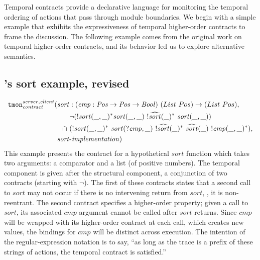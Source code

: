 Temporal contracts provide a declarative language for monitoring the temporal ordering of actions that pass through module boundaries.
%
We begin with a simple example that exhibits the expressiveness of temporal higher-order contracts to frame the discussion.
%
The following example comes from the original work on temporal higher-order contracts, and its behavior led us to explore alternative semantics.
%
\newcommand{\sortid}{\mathit{sort}}
\subsection{\dfm's sort example, revised} \label{sec:sort}
%
\renewcommand*{\arraystretch}{1.2}
\newcommand*{\call}[1]{\scallev{#1}{\_}}
\newcommand*{\ret}[1]{\sretev{#1}{\_}}
\begin{align*}
 {\tt tmon}^{{\mathit{server}},{\mathit{client}}}_{\mathit{contract}}(\sortid &: (\mathit{cmp} : \mathit{Pos} \to \mathit{Pos} \to \mathit{Bool})\ (List\ Pos) \to (List\ Pos), \\
 &\stnot{(\stmany{\snonevent{\sortid(\_,\_)}} \sortid(\_,\_)~ \stmany{\snonevent{\retof{\sortid}(\_)}}~ \sortid(\_,\_))} \\
 \cap\  &(\stmany{\snonevent{\sortid(\_,\_)}}~ \sortid(?\mathit{cmp}, \_)~ \stmany{\snonevent{\retof{\sortid}(\_)}}~ \retof{\sortid}(\_)~ \stmany{\snonevent{\mathit{cmp}(\_,\_)}}), \\
 \mathit{sort}&\text{-}\mathit{implementation})
\end{align*}
%
This example presents the contract for a hypothetical $\sortid$ function which takes two arguments: a comparator and a list (of positive numbers).
%
The temporal component is given after the structural component, a conjunction of two contracts (starting with $\neg$).
%
The first of these contracts states that a second call to $\sortid$ may not occur if there is no intervening return from $\sortid$, \ie, it is non-reentrant.
%
The second contract specifies a higher-order property; given a call to $\sortid$, its associated $\mathit{cmp}$ argument cannot be called after $\sortid$ returns.
%
Since $\mathit{cmp}$ will be wrapped with its higher-order contract at each call, which creates new values, the bindings for $\mathit{cmp}$ will be distinct across execution.
%
The intention of the regular-expression notation is to say, ``as long as the trace is a prefix of these strings of actions, the temporal contract is satisfied.''

